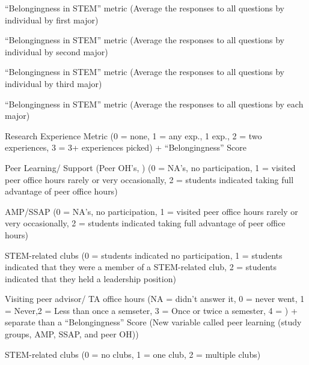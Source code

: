 \documentclass[
]{article}
\begin{document}
``Belongingness in STEM'' metric (Average the responses to all questions
by individual by first major)

``Belongingness in STEM'' metric (Average the responses to all questions
by individual by second major)

``Belongingness in STEM'' metric (Average the responses to all questions
by individual by third major)

``Belongingness in STEM'' metric (Average the responses to all questions
by each major)

Research Experience Metric (0 = none, 1 = any exp., 1 exp., 2 = two
experiences, 3 = 3+ experiences picked) + ``Belongingness'' Score

Peer Learning/ Support (Peer OH's, ) (0 = NA's, no participation, 1 =
visited peer office hours rarely or very occasionally, 2 = students
indicated taking full advantage of peer office hours)

AMP/SSAP (0 = NA's, no participation, 1 = visited peer office hours
rarely or very occasionally, 2 = students indicated taking full
advantage of peer office hours)

STEM-related clubs (0 = students indicated no participation, 1 =
students indicated that they were a member of a STEM-related club, 2 =
students indicated that they held a leadership position)

Visiting peer advisor/ TA office hours (NA = didn't answer it, 0 = never
went, 1 = Never,2 = Less than once a semseter, 3 = Once or twice a
semester, 4 = ) + separate than a ``Belongingness'' Score (New variable
called peer learning (study groups, AMP, SSAP, and peer OH))

STEM-related clubs (0 = no clubs, 1 = one club, 2 = multiple clubs)
\end{document}
